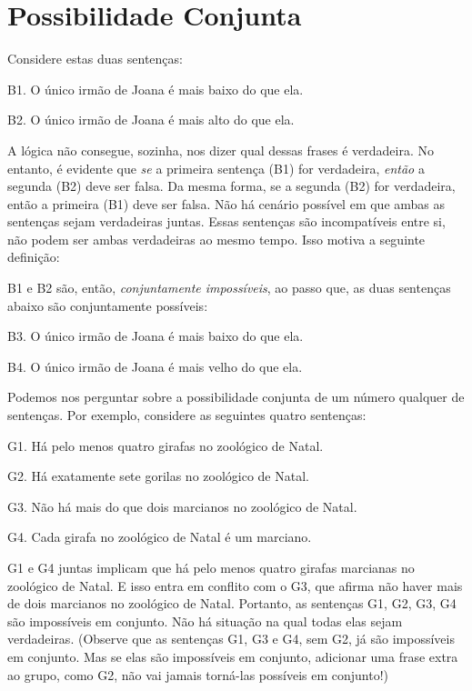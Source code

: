 \section{Possibilidade Conjunta}
Considere estas duas sentenças:
	\begin{ebullet}
		\item[B1.] O único irmão de Joana é mais baixo do que ela.
		\item[B2.] O único irmão de Joana é mais alto do que ela.
	\end{ebullet}	
A lógica não consegue, sozinha, nos dizer qual dessas frases é verdadeira.
No entanto, é evidente que \emph{se} a primeira sentença (B1) for verdadeira, \emph{então} a segunda (B2) deve ser falsa.
Da mesma forma, se a segunda (B2) for verdadeira, então a primeira (B1) deve ser falsa.
Não há cenário possível em que ambas as sentenças sejam verdadeiras juntas.
Essas sentenças são incompatíveis entre si, não podem ser ambas verdadeiras ao mesmo tempo.
Isso motiva a seguinte definição:

B1 e B2 são, então, \emph{conjuntamente impossíveis}, ao passo que, as duas sentenças abaixo são conjuntamente possíveis:
	\begin{ebullet}
		\item[B3.] O único irmão de Joana é mais baixo do que ela.
		\item[B4.] O único irmão de Joana é mais velho do que ela.
	\end{ebullet}

Podemos nos perguntar sobre a possibilidade conjunta de um número qualquer de sentenças.
Por exemplo, considere as seguintes quatro sentenças:
	\begin{ebullet}	
		\item[G1.] \label{MartianGiraffes} Há pelo menos quatro girafas no zoológico de Natal.
		\item[G2.] Há exatamente sete gorilas no zoológico de Natal.
		\item[G3.] Não há mais do que dois marcianos no zoológico de Natal.
		\item[G4.] Cada girafa no zoológico de Natal é um marciano.
	\end{ebullet}
G1 e G4 juntas implicam que há pelo menos quatro girafas marcianas no zoológico de Natal.
E isso entra em conflito com o G3, que afirma não haver mais de dois marcianos no zoológico de Natal.
Portanto, as sentenças G1, G2, G3, G4 são impossíveis em conjunto.
Não há situação na qual todas elas sejam verdadeiras. 
(Observe que as sentenças G1, G3 e G4, sem G2, já são impossíveis em conjunto.
Mas se elas são impossíveis em conjunto, adicionar uma frase extra ao grupo, como G2, não vai jamais torná-las possíveis em conjunto!)

